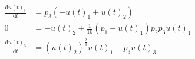 \begin{align}
\frac{\mathrm{d} u\left( t \right)_{1}}{\mathrm{d}t} &= p_{3} \left(  - u\left( t \right)_{1} + u\left( t \right)_{2} \right) \\
0 &=  - u\left( t \right)_{2} + \frac{1}{10} \left( p_{1} - u\left( t \right)_{1} \right) p_{2} p_{3} u\left( t \right)_{1} \\
\frac{\mathrm{d} u\left( t \right)_{3}}{\mathrm{d}t} &= \left( u\left( t \right)_{2} \right)^{\frac{2}{3}} u\left( t \right)_{1} - p_{3} u\left( t \right)_{3}
\end{align}
